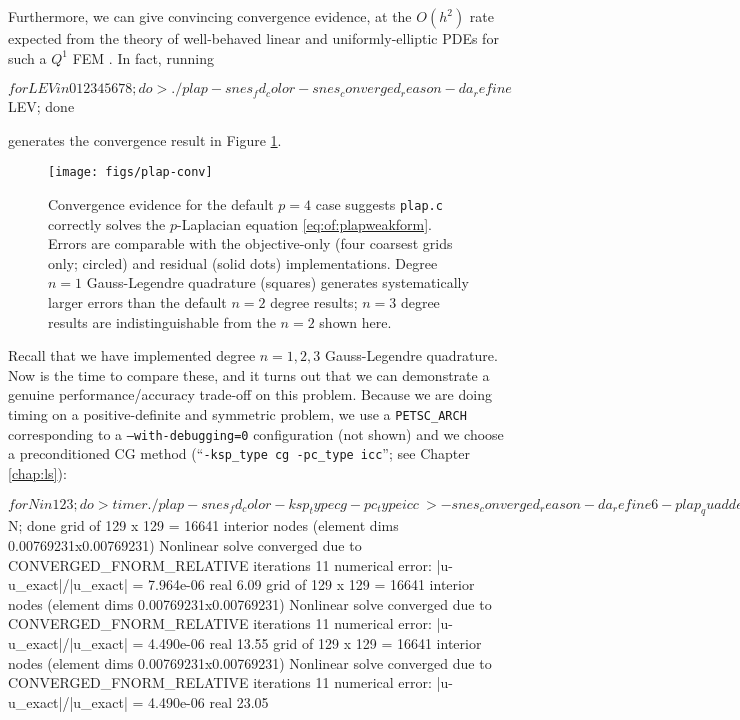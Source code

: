 Furthermore, we can give convincing convergence evidence, at the $O(h^2)$ rate expected from the theory of well-behaved linear and uniformly-elliptic PDEs for such a $Q^1$ FEM \citep{Elmanetal2005}.  In fact, running
\begin{cline}
$ for LEV in 0 1 2 3 4 5 6 7 8; do
> ./plap -snes_fd_color -snes_converged_reason -da_refine $LEV; done
\end{cline}
generates the convergence result in Figure \ref{fig:of:plap-conv}.

\begin{figure}
\texttt{[image: figs/plap-conv]}
\caption{Convergence evidence for the default $p=4$ case suggests \texttt{plap.c} correctly solves the $p$-Laplacian equation \eqref{eq:of:plapweakform}.  Errors are comparable with the objective-only (four coarsest grids only; circled) and residual (solid dots) implementations.  Degree $n=1$ Gauss-Legendre quadrature (squares) generates systematically larger errors than the default $n=2$ degree results; $n=3$ degree results are indistinguishable from the $n=2$ shown here.}
\label{fig:of:plap-conv}
\end{figure}

Recall that we have implemented degree $n=1,2,3$ Gauss-Legendre quadrature.  Now is the time to compare these, and it turns out that we can demonstrate a genuine performance/accuracy trade-off on this problem.  Because we are doing timing on a positive-definite and symmetric problem, we use a \texttt{PETSC\_ARCH} corresponding to a \texttt{--with-debugging=0} \PETSc configuration (not shown) and we choose a preconditioned CG method (``\texttt{-ksp\_type cg -pc\_type icc}''; see Chapter \ref{chap:ls}):
\begin{cline}
$ for N in 1 2 3; do
> timer ./plap -snes_fd_color -ksp_type cg -pc_type icc \
>   -snes_converged_reason -da_refine 6 -plap_quaddegree $N; done
grid of 129 x 129 = 16641 interior nodes (element dims 0.00769231x0.00769231)
Nonlinear solve converged due to CONVERGED_FNORM_RELATIVE iterations 11
numerical error:  |u-u_exact|/|u_exact| = 7.964e-06
real 6.09
grid of 129 x 129 = 16641 interior nodes (element dims 0.00769231x0.00769231)
Nonlinear solve converged due to CONVERGED_FNORM_RELATIVE iterations 11
numerical error:  |u-u_exact|/|u_exact| = 4.490e-06
real 13.55
grid of 129 x 129 = 16641 interior nodes (element dims 0.00769231x0.00769231)
Nonlinear solve converged due to CONVERGED_FNORM_RELATIVE iterations 11
numerical error:  |u-u_exact|/|u_exact| = 4.490e-06
real 23.05
\end{cline}

